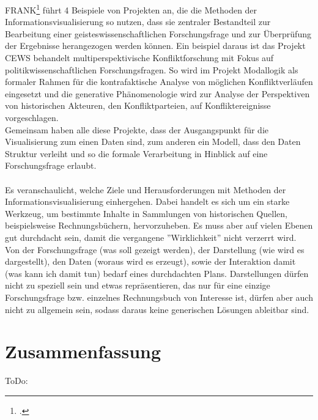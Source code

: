 \documentclass[12pt,a4paper]{article}
\begin{document}
FRANK\footcite{frank2018visualisierungswerkzeuge} führt 4 Beispiele von Projekten an, die die Methoden der Informationsvisualisierung so nutzen, dass sie zentraler Bestandteil zur Bearbeitung einer geisteswissenschaftlichen Forschungsfrage und zur Überprüfung der Ergebnisse herangezogen werden können. Ein beispiel daraus ist das Projekt CEWS behandelt multiperspektivische Konfliktforschung mit Fokus auf politikwissenschaftlichen Forschungsfragen. So wird im Projekt Modallogik als formaler Rahmen für die kontrafaktische Analyse von möglichen Konfliktverläufen eingesetzt und die generative Phänomenologie wird zur Analyse der Perspektiven von historischen Akteuren, den Konfliktparteien, auf Konfliktereignisse vorgeschlagen.
\\
Gemeinsam haben alle diese Projekte, dass der Ausgangspunkt für die Visualisierung zum einen Daten sind, zum anderen ein Modell, dass den Daten Struktur verleiht und so die formale Verarbeitung in Hinblick auf eine Forschungsfrage erlaubt.
\\
\\
Es veranschaulicht, welche Ziele und Herausforderungen mit Methoden der Informationsvisualisierung einhergehen. Dabei handelt es sich um ein starke Werkzeug, um bestimmte Inhalte in Sammlungen von historischen Quellen, beispielsweise Rechnungsbüchern, hervorzuheben. Es muss aber auf vielen Ebenen gut durchdacht sein, damit die vergangene ''Wirklichkeit'' nicht verzerrt wird. Von der Forschungsfrage (was soll gezeigt werden), der Darstellung (wie wird es dargestellt), den Daten (woraus wird es erzeugt), sowie der Interaktion damit (was kann ich damit tun) bedarf eines durchdachten Plans. Darstellungen dürfen nicht zu speziell sein und etwas repräsentieren, das nur für eine einzige Forschungsfrage bzw. einzelnes Rechnungsbuch von Interesse ist, dürfen aber auch nicht zu allgemein sein, sodass daraus keine generischen Lösungen ableitbar sind.


\newpage
\section{Zusammenfassung}

ToDo:

\newpage


\newpage
\listoffigures
\end{document}
